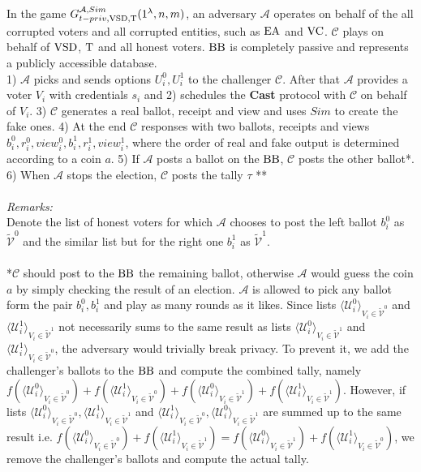  In the game $G_{t-priv,\operatorname{VSD},\operatorname{T}}^{\mathcal{A}, Sim}(1^{\lambda},n,m)$, an adversary $\mathcal{A}$  operates on behalf of the all corrupted voters and all corrupted entities, such as  $\operatorname{EA}$ and $\operatorname{VC}$.  $\mathcal{C}$ plays on behalf of $\operatorname{VSD}$, $\operatorname{T}$ and all honest voters. $\operatorname{BB}$ is completely passive and represents a publicly accessible database.\\
 
 1)  $\mathcal{A}$ picks and sends options $U_i^0, U_i^1$ to the challenger $\mathcal{C}$.  After that $\mathcal{A}$ provides a voter $V_i$ with credentials $s_i$ and 2) schedules the \textbf{Cast} protocol with $\mathcal{C}$ on behalf of $V_i$. 3) $\mathcal{C}$ generates a real ballot, receipt and view and uses $Sim$ to create the fake ones.  4) At the end $\mathcal{C}$ responses with two ballots, receipts and views $b_i^0,r_i^0,view_i^0,b_i^1,r_i^1,view_i^1$, where the order of real and fake output is determined according to a coin $a$. 5) If $\mathcal{A}$ posts a ballot on the $\operatorname{BB}$, $\mathcal{C}$ posts the other ballot*. 6)  When $\mathcal{A}$ stops the election, $\mathcal{C}$ posts the tally $\tau$ ** \\\\
\textit{Remarks:}\\
Denote the list of honest voters for which $\mathcal{A}$ chooses to post the left ballot $b_i^0$  as $ \tilde{\mathcal{V}}^0$ and the similar list but for the right one $b_i^1$ as $ \tilde{\mathcal{V}}^1$. \\\\
*$\mathcal{C}$ should post to the $\operatorname{BB}$ the remaining ballot, otherwise  $\mathcal{A}$  would guess the coin $a$ by simply checking the result of an election. $\mathcal{A}$ is allowed to pick any ballot form the pair $b_i^0,b_i^1$  and play as many rounds as it likes. Since lists $\langle \mathcal{U}^0_i \rangle _{V_i \in \tilde{\mathcal{V}}^0} $ and  $\langle \mathcal{U}^1_i \rangle _{V_i \in \tilde{\mathcal{V}}^1} $  not necessarily  sums to  the same result as lists  $\langle \mathcal{U}^0_i \rangle _{V_i \in \tilde{\mathcal{V}}^1} $ and  $\langle \mathcal{U}^1_i \rangle _{V_i \in \tilde{\mathcal{V}}^0} $, the adversary would trivially break privacy. To prevent it, we add the challenger's ballots to the $\operatorname{BB}$ and compute the combined tally, namely $f(\langle \mathcal{U}^0_i \rangle _{V_i \in \tilde{\mathcal{V}}^0} ) + f(\langle \mathcal{U}^1_i \rangle _{V_i \in \tilde{\mathcal{V}}^0} )+ f(\langle \mathcal{U}^0_i \rangle _{V_i \in \tilde{\mathcal{V}}^1} ) +  f(\langle \mathcal{U}^1_i \rangle _{V_i \in \tilde{\mathcal{V}}^1} )$. However, if lists $\langle \mathcal{U}^0_i \rangle _{V_i \in \tilde{\mathcal{V}}^0}, \langle \mathcal{U}^1_i \rangle _{V_i \in \tilde{\mathcal{V}}^1}$ and $\langle \mathcal{U}^1_i \rangle _{V_i \in \tilde{\mathcal{V}}^0}, \langle \mathcal{U}^0_i \rangle _{V_i \in \tilde{\mathcal{V}}^1}$ are summed up to the same result i.e. $f(\langle \mathcal{U}^0_i \rangle _{V_i \in \tilde{\mathcal{V}}^0} ) + f(\langle \mathcal{U}^1_i \rangle _{V_i \in \tilde{\mathcal{V}}^1} ) =  f(\langle \mathcal{U}^0_i \rangle _{V_i \in \tilde{\mathcal{V}}^1} ) +  f(\langle \mathcal{U}^1_i \rangle _{V_i \in \tilde{\mathcal{V}}^0} )$, we remove the challenger's ballots and compute the actual tally. \\\\
